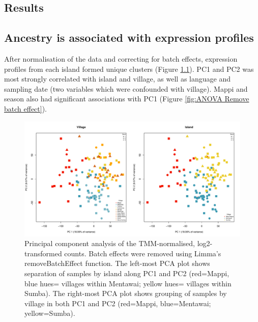 \documentclass[12pt,a4paper,titlepage,twoside,openright]{book}
\begin{document}
\begin{mainmatter}
{\chapter{Results}\label{}

\section{Ancestry is associated with expression profiles}

After normalisation of the data and correcting for batch effects, expression profiles from each island formed unique clusters (Figure \ref{fig:Remove Batch Effect Island and Village}). PC1 and PC2 was most strongly correlated with island and village, as well as language and sampling date (two variables which were confounded with village). Mappi and season also had significant associations with PC1 (Figure \ref{fig:ANOVA Remove batch effect}). 

\begin{figure}[htb!]
\centering
\includegraphics[width=\textwidth,height=\textheight,keepaspectratio]{Figures/samplingsiteAndVillagePCA.pdf}
\caption{Principal component analysis of the TMM-normalised, log2-transformed counts. Batch effects were removed using Limma's removeBatchEffect function. The left-most PCA plot shows separation of samples by island along PC1 and PC2 (red=Mappi, blue hues= villages within Mentawai; yellow hues= villages within Sumba). The right-most PCA plot shows grouping of samples by village in both PC1 and PC2 (red=Mappi, blue=Mentawai; yellow=Sumba).}
\label{fig:Remove Batch Effect Island and Village}
\end{figure}

}
\end{mainmatter}
\end{document}
